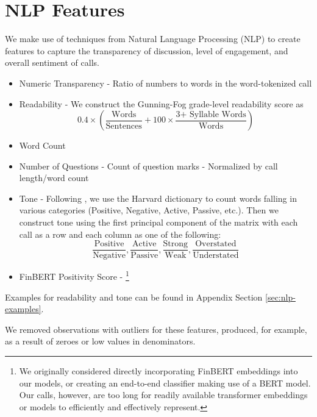 \documentclass{article}[11pt]
\begin{document}
    \section*{NLP Features}

    We make use of techniques from Natural Language Processing (NLP) to create features to capture the transparency of discussion, level of engagement, and overall sentiment of calls.

    \begin{itemize}
        \item Numeric Transparency - Ratio of numbers to words in the word-tokenized call
        \item Readability - We construct the Gunning-Fog grade-level readability score \citep{gunning_technique_1952} as 
        \begin{equation*}
            0.4 \times (\frac{\text{Words}}{\text{Sentences}} + 100 \times \frac{\text{3+ Syllable Words}}{\text{Words}})
        \end{equation*}
        \item Word Count
        \item Number of Questions - Count of question marks - Normalized by call length/word count
        \item Tone - Following \cite{price_earnings_2012}, we use the Harvard dictionary to count words falling in various categories (Positive, Negative, Active, Passive, etc.). Then we construct tone using the first principal component of the matrix with each call as a row and each column as one of the following:
        \begin{equation*}
            \frac{\text{Positive}}{\text{Negative}}, \frac{\text{Active}}{\text{Passive}}, \frac{\text{Strong}}{\text{Weak}}, \frac{\text{Overstated}}{\text{Understated}}
        \end{equation*}
        \item FinBERT Positivity Score - \footnote{We originally considered directly incorporating FinBERT embeddings into our models, or creating an end-to-end classifier making use of a BERT model. Our calls, however, are too long for readily available transformer embeddings or models to efficiently and effectively represent.}
    \end{itemize}

    Examples for readability and tone can be found in Appendix Section \ref{sec:nlp-examples}.

    We removed observations with outliers for these features, produced, for example, as a result of zeroes or low values in denominators.
    
\end{document}
